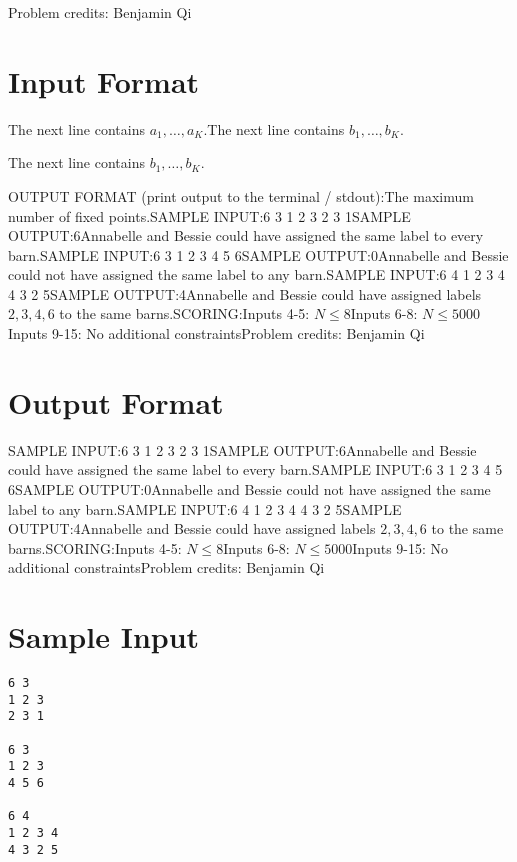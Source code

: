\documentclass[12pt]{article}
\begin{document}
Problem credits: Benjamin Qi



\section*{Input Format}
The next line contains $a_1,\dots, a_K$.The next line contains $b_1,\dots, b_K$.

The next line contains $b_1,\dots, b_K$.

OUTPUT FORMAT (print output to the terminal / stdout):The maximum number of fixed points.SAMPLE INPUT:6 3
1 2 3
2 3 1SAMPLE OUTPUT:6Annabelle and Bessie could have assigned the same label to every barn.SAMPLE INPUT:6 3
1 2 3
4 5 6SAMPLE OUTPUT:0Annabelle and Bessie could not have assigned the same label to any barn.SAMPLE INPUT:6 4
1 2 3 4
4 3 2 5SAMPLE OUTPUT:4Annabelle and Bessie could have assigned labels $2,3,4,6$ to the same barns.SCORING:Inputs 4-5: $N \le 8$Inputs 6-8: $N \le 5000$Inputs
9-15: No additional constraintsProblem credits: Benjamin Qi

\section*{Output Format}
SAMPLE INPUT:6 3
1 2 3
2 3 1SAMPLE OUTPUT:6Annabelle and Bessie could have assigned the same label to every barn.SAMPLE INPUT:6 3
1 2 3
4 5 6SAMPLE OUTPUT:0Annabelle and Bessie could not have assigned the same label to any barn.SAMPLE INPUT:6 4
1 2 3 4
4 3 2 5SAMPLE OUTPUT:4Annabelle and Bessie could have assigned labels $2,3,4,6$ to the same barns.SCORING:Inputs 4-5: $N \le 8$Inputs 6-8: $N \le 5000$Inputs
9-15: No additional constraintsProblem credits: Benjamin Qi

\section*{Sample Input}
\begin{verbatim}
6 3
1 2 3
2 3 1

6 3
1 2 3
4 5 6

6 4
1 2 3 4
4 3 2 5
\end{verbatim}
\end{document}
